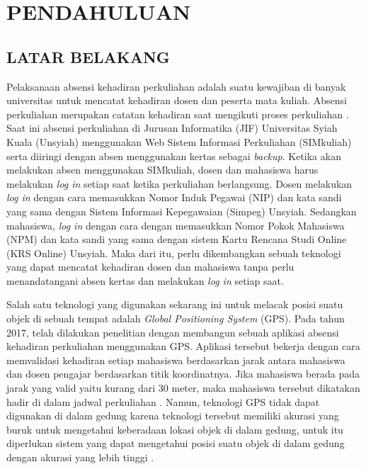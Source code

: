 \fancyhf{} 
\fancyfoot[C]{\thepage}


\chapter{PENDAHULUAN}

\section{\uppercase{LATAR BELAKANG}}
Pelaksanaan absensi kehadiran perkuliahan adalah suatu kewajiban di banyak universitas untuk mencatat kehadiran dosen dan peserta mata kuliah. Absensi perkuliahan merupakan catatan kehadiran saat mengikuti proses perkuliahan \citep{Setiawan2015}. Saat ini absensi perkuliahan di Jurusan Informatika (JIF) Universitas Syiah Kuala (Unsyiah) menggunakan Web Sistem Informasi Perkuliahan (SIMkuliah) serta diiringi dengan absen menggunakan kertas sebagai \textit{backup}. Ketika akan melakukan absen menggunakan SIMkuliah, dosen dan mahasiswa harus melakukan \textit{log in} setiap saat ketika perkuliahan berlangsung. Dosen melakukan \textit{log in} dengan cara memasukkan Nomor Induk Pegawai (NIP) dan kata sandi yang sama dengan Sistem Informasi Kepegawaian (Simpeg) Unsyiah. Sedangkan mahasiswa, \textit{log in} dengan cara dengan memasukkan Nomor Pokok Mahasiswa (NPM) dan kata sandi yang sama dengan sistem Kartu Rencana Studi Online (KRS Online) Unsyiah. Maka dari itu, perlu dikembangkan sebuah teknologi yang dapat mencatat kehadiran dosen dan mahasiswa tanpa perlu menandatangani absen kertas dan melakukan \textit{log in} setiap saat. 

\par Salah satu teknologi yang digunakan sekarang ini untuk melacak posisi suatu objek di sebuah tempat adalah \textit{Global Positioning System} (GPS). Pada tahun 2017, telah dilakukan penelitian dengan membangun sebuah aplikasi absensi kehadiran perkuliahan menggunakan GPS. Aplikasi tersebut bekerja dengan cara memvalidasi kehadiran setiap mahasiswa berdasarkan jarak antara mahasiswa dan dosen pengajar berdasarkan titik koordinatnya. Jika mahasiswa berada pada jarak yang valid yaitu kurang dari 30 meter, maka mahasiswa tersebut dikatakan hadir di dalam jadwal perkuliahan \citep{Saputra2019}. Namun, teknologi GPS tidak dapat digunakan di dalam gedung karena teknologi tersebut memiliki akurasi yang buruk untuk mengetahui keberadaan lokasi objek di dalam gedung, untuk itu diperlukan sistem yang dapat mengetahui posisi suatu objek di dalam gedung dengan akurasi yang lebih tinggi \citep{Keluza2017}. 

